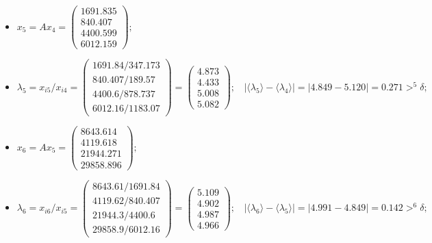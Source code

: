 \begin{itemize}
    \item
    $x_5 = Ax_4 =
    \begin{pmatrix}
        1691.835\\840.407\\4400.599\\6012.159
    \end{pmatrix};$
    \item
    $\lambda_5 = x_{i5} / x_{i4} =
    \begin{pmatrix}
        1691.84/347.173\\840.407/189.57\\4400.6/878.737\\6012.16/1183.07
    \end{pmatrix} =
    \begin{pmatrix}
        4.873\\4.433\\5.008\\5.082
    \end{pmatrix};~~~~
    |\langle\lambda_5\rangle-\langle\lambda_4\rangle| = |4.849 - 5.120| = 0.271 >^5 \delta;$



    \item
    $x_6 = Ax_5 =
    \begin{pmatrix}
        8643.614\\4119.618\\21944.271\\29858.896
    \end{pmatrix};$
    \item
    $\lambda_6 = x_{i6} / x_{i5} =
    \begin{pmatrix}
        8643.61/1691.84\\4119.62/840.407\\21944.3/4400.6\\29858.9/6012.16
    \end{pmatrix} =
    \begin{pmatrix}
        5.109\\4.902\\4.987\\4.966
    \end{pmatrix};~~~~
    |\langle\lambda_6\rangle-\langle\lambda_5\rangle| = |4.991 - 4.849| = 0.142 >^6 \delta;$




\end{itemize}
